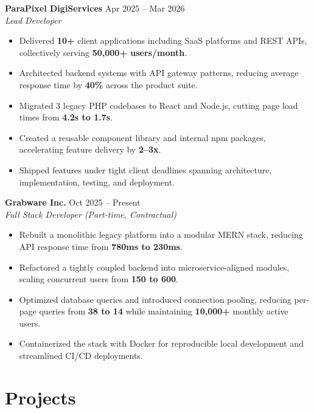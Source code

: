 \documentclass[a4paper,10pt]{article}
\begin{document}
\textbf{ParaPixel DigiServices} \hfill Apr 2025 -- Mar 2026 \\
\textit{Lead Developer}
\begin{itemize}[leftmargin=2.2em]
    \item Delivered \textbf{10+} client applications including SaaS platforms and REST APIs, collectively serving \textbf{50,000+ users/month}.
    \item Architected backend systems with API gateway patterns, reducing average response time by \textbf{40\%} across the product suite.
    \item Migrated 3 legacy PHP codebases to React and Node.js, cutting page load times from \textbf{4.2s to 1.7s}.
    \item Created a reusable component library and internal npm packages, accelerating feature delivery by \textbf{2--3x}.
    \item Shipped features under tight client deadlines spanning architecture, implementation, testing, and deployment.
\end{itemize}

\vspace{1mm}

\textbf{Grabware Inc.} \hfill Oct 2025 -- Present \\
\textit{Full Stack Developer (Part-time, Contractual)}
\begin{itemize}[leftmargin=2.2em]
    \item Rebuilt a monolithic legacy platform into a modular MERN stack, reducing API response time from \textbf{780ms to 230ms}.
    \item Refactored a tightly coupled backend into microservice-aligned modules, scaling concurrent users from \textbf{150 to 600}.
    \item Optimized database queries and introduced connection pooling, reducing per-page queries from \textbf{38 to 14} while maintaining \textbf{10,000+} monthly active users.
    \item Containerized the stack with Docker for reproducible local development and streamlined CI/CD deployments.
\end{itemize}

\vspace{1mm}

\section*{Projects}
\end{document}
